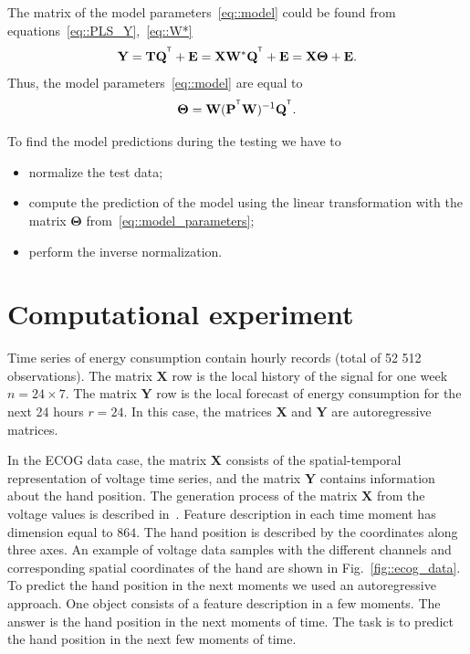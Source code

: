 \documentclass[12pt,twoside]{article}
\newcommand{\bY}{\mathbf{Y}}
\newcommand{\bX}{\mathbf{X}}
\newcommand{\bP}{\mathbf{P}}
\newcommand{\bT}{\mathbf{T}}
\newcommand{\bQ}{\mathbf{Q}}
\newcommand{\bE}{\mathbf{E}}
\newcommand{\bW}{\mathbf{W}}
\newcommand{\bTheta}{\boldsymbol{\Theta}}
\newcommand{\T}{^{\text{\tiny\sffamily\upshape\mdseries T}}}
\begin{document}
The matrix of the model parameters~\ref{eq::model} could be found from equations~\eqref{eq::PLS_Y},~\eqref{eq::W*}
\begin{equation*}
    \bY = \bT \bQ^{\T} + \bE = \bX \bW^* \bQ^{\T} + \bE = \bX \bTheta + \bE.
\end{equation*}
Thus, the model parameters~\eqref{eq::model} are equal to
\begin{equation}
    \bTheta = \bW (\bP^{\T} \bW)^{-1} \bQ^{\T}.
    \label{eq::model_parameters}
\end{equation}

To find the model predictions during the testing we have to
\begin{itemize}
	\item normalize the test data;
	\item compute the prediction of the model using the linear transformation with the matrix $\bTheta$ from~\eqref{eq::model_parameters};
	\item perform the inverse normalization.
\end{itemize}

\section{Computational experiment}
\label{sec:exper}

Time series of energy consumption contain hourly records (total of 52 512 observations). 
The matrix $\bX$ row is the local history of the signal for one week $n = 24 \times 7$. 
The matrix $\bY$ row is the local forecast of energy consumption for the next 24 hours $r = 24$. 
In this case, the matrices $\bX$ and $\bY$ are autoregressive matrices.

In the ECOG data case, the matrix $\bX$ consists of the spatial-temporal representation of voltage time series, and the matrix $\bY$ contains information about the hand position.
The generation process of the matrix $\bX$ from the voltage values is described in~\cite{gasanov2017pls}. 
Feature description in each time moment has dimension equal to $864$. The hand position is described by the coordinates along three axes. 
An example of voltage data samples with the different channels and corresponding spatial coordinates of the hand are shown in Fig.~\ref{fig::ecog_data}.
To predict the hand position in the next moments we used an autoregressive approach.
One object consists of a feature description in a few moments. 
The answer is the hand position in the next moments of time.
The task is to predict the hand position in the next few moments of time.
\end{document}
